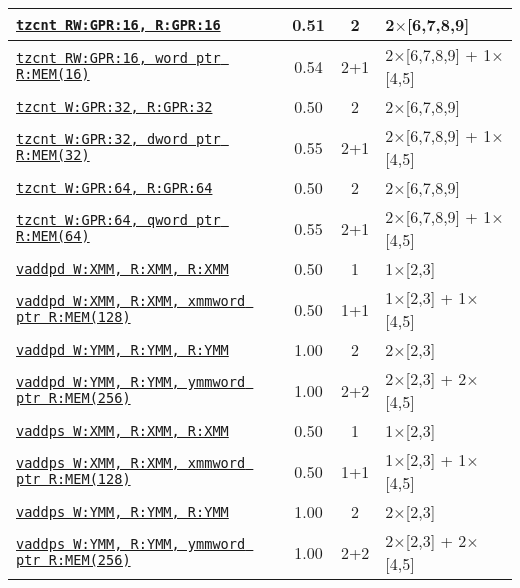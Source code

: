 \documentclass[a4paper,english,fontsize=9]{scrartcl}
\begin{document}
\begin{longtable}{p{}ccL{.25\textwidth}}
  \midrule
  \texttt{\href{https://felixcloutier.com/x86/TZCNT.html}{tzcnt RW:GPR:16, R:GPR:16}} & 0.51 & 2 & 2\(\times\)[6,7,8,9] \\
  \midrule
  \texttt{\href{https://felixcloutier.com/x86/TZCNT.html}{tzcnt RW:GPR:16, word ptr R:MEM(16)}} & 0.54 & 2+1 & 2\(\times\)[6,7,8,9] + 1\(\times\)[4,5] \\
  \midrule
  \texttt{\href{https://felixcloutier.com/x86/TZCNT.html}{tzcnt W:GPR:32, R:GPR:32}} & 0.50 & 2 & 2\(\times\)[6,7,8,9] \\
  \midrule
  \texttt{\href{https://felixcloutier.com/x86/TZCNT.html}{tzcnt W:GPR:32, dword ptr R:MEM(32)}} & 0.55 & 2+1 & 2\(\times\)[6,7,8,9] + 1\(\times\)[4,5] \\
  \midrule
  \texttt{\href{https://felixcloutier.com/x86/TZCNT.html}{tzcnt W:GPR:64, R:GPR:64}} & 0.50 & 2 & 2\(\times\)[6,7,8,9] \\
  \midrule
  \texttt{\href{https://felixcloutier.com/x86/TZCNT.html}{tzcnt W:GPR:64, qword ptr R:MEM(64)}} & 0.55 & 2+1 & 2\(\times\)[6,7,8,9] + 1\(\times\)[4,5] \\
  \midrule
  \texttt{\href{https://felixcloutier.com/x86/ADDPD.html}{vaddpd W:XMM, R:XMM, R:XMM}} & 0.50 & 1 & 1\(\times\)[2,3] \\
  \midrule
  \texttt{\href{https://felixcloutier.com/x86/ADDPD.html}{vaddpd W:XMM, R:XMM, xmmword ptr R:MEM(128)}} & 0.50 & 1+1 & 1\(\times\)[2,3] + 1\(\times\)[4,5] \\
  \midrule
  \texttt{\href{https://felixcloutier.com/x86/ADDPD.html}{vaddpd W:YMM, R:YMM, R:YMM}} & 1.00 & 2 & 2\(\times\)[2,3] \\
  \midrule
  \texttt{\href{https://felixcloutier.com/x86/ADDPD.html}{vaddpd W:YMM, R:YMM, ymmword ptr R:MEM(256)}} & 1.00 & 2+2 & 2\(\times\)[2,3] + 2\(\times\)[4,5] \\
  \midrule
  \texttt{\href{https://felixcloutier.com/x86/ADDPS.html}{vaddps W:XMM, R:XMM, R:XMM}} & 0.50 & 1 & 1\(\times\)[2,3] \\
  \midrule
  \texttt{\href{https://felixcloutier.com/x86/ADDPS.html}{vaddps W:XMM, R:XMM, xmmword ptr R:MEM(128)}} & 0.50 & 1+1 & 1\(\times\)[2,3] + 1\(\times\)[4,5] \\
  \midrule
  \texttt{\href{https://felixcloutier.com/x86/ADDPS.html}{vaddps W:YMM, R:YMM, R:YMM}} & 1.00 & 2 & 2\(\times\)[2,3] \\
  \midrule
  \texttt{\href{https://felixcloutier.com/x86/ADDPS.html}{vaddps W:YMM, R:YMM, ymmword ptr R:MEM(256)}} & 1.00 & 2+2 & 2\(\times\)[2,3] + 2\(\times\)[4,5] \\

\end{longtable}
\end{document}

